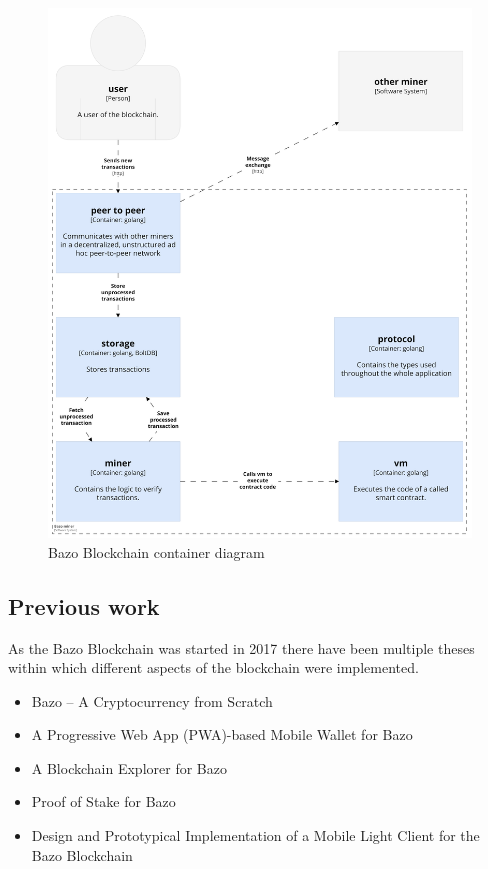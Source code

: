 \begin{figure}[H]
	\begin{center}
	\includegraphics[width=\textwidth]{./images/BAZO_Container}
	\caption{Bazo Blockchain container diagram}
	\label{systemcontainerdiagram}
	\end{center}
\end{figure}
\pagebreak

\subsection{Previous work}
As the Bazo Blockchain was started in 2017 there have been multiple theses within which different aspects of the blockchain were implemented. 
\begin{itemize}
	\item Bazo – A Cryptocurrency from Scratch \cite{ba_miner}
	\item A Progressive Web App (PWA)-based Mobile Wallet for Bazo \cite{ba_wallet}
	\item A Blockchain Explorer for Bazo \cite{ba_explorer}
	\item Proof of Stake for Bazo \cite{ba_pos}
	\item Design and Prototypical Implementation of a Mobile Light Client for the Bazo Blockchain \cite{ba_client}
\end{itemize}

